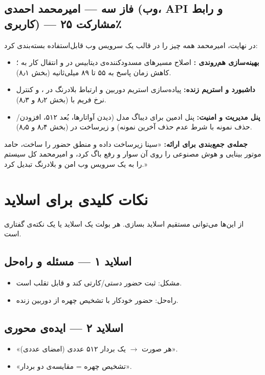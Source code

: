 \documentclass[12pt,a4paper]{article}
\begin{document}
\subsection{فاز سه — امیرمحمد احمدی (وب، API و رابط کاربری) — مشارکت ۲۵٪}
در نهایت، امیرمحمد همه چیز را در قالب یک سرویس وب قابل‌استفاده بسته‌بندی کرد:
\begin{itemize}[rightmargin=0pt]
  \item \textbf{بهینه‌سازی هم‌روندی :} اصلاح مسیرهای مسدودکننده‌ی دیتابیس در  و انتقال کار به ؛ کاهش زمان پاسخ  به ۵۵ تا ۸۹ میلی‌ثانیه (بخش ۸٫۱).
  \item \textbf{داشبورد و استریم زنده:} پیاده‌سازی استریم  دوربین و ارتباط بلادرنگ  در ، و کنترل نرخ فریم با  (بخش ۸٫۲ و ۸٫۳).
  \item \textbf{پنل مدیریت و امنیت:} پنل ادمین برای دیباگ مدل (دیدن آواتارها، بُعد ۵۱۲، افزودن/حذف نمونه با شرط عدم حذف آخرین نمونه) و زیرساخت  در  (بخش ۸٫۴ و ۸٫۵).
\end{itemize}

\begin{note}
\textbf{جمله‌ی جمع‌بندی برای ارائه:} «سینا زیرساخت داده و منطق حضور را ساخت، حامد موتور بینایی و هوش مصنوعی را روی آن سوار و رفع باگ کرد، و امیرمحمد کل سیستم را به یک سرویس وب امن و بلادرنگ تبدیل کرد.»
\end{note}

\section{نکات کلیدی برای اسلاید}
از این‌ها می‌توانی مستقیم اسلاید بسازی. هر بولت یک اسلاید یا یک نکته‌ی گفتاری است.

\subsection*{اسلاید ۱ — مسئله و راه‌حل}
\begin{itemize}[rightmargin=0pt]
  \item مشکل: ثبت حضور دستی/کارتی کند و قابل تقلب است.
  \item راه‌حل: حضور خودکار با تشخیص چهره از دوربین زنده.
\end{itemize}

\subsection*{اسلاید ۲ — ایده‌ی محوری}
\begin{itemize}[rightmargin=0pt]
  \item «هر صورت $\rightarrow$ یک بردار ۵۱۲ عددی (امضای عددی)».
  \item «تشخیص چهره = مقایسه‌ی دو بردار».
\end{itemize}
\end{document}
